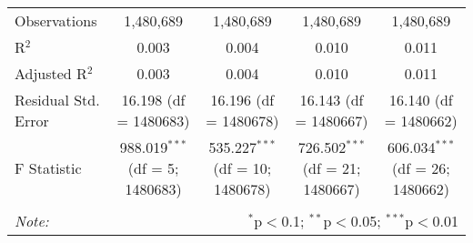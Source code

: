 \documentclass[
]{article}
\begin{document}
\begin{table}[!htbp]
{\begin{tabular}{@{\extracolsep{5pt}}lcccc}
Observations & 1,480,689 & 1,480,689 & 1,480,689 & 1,480,689 \\ 
R$^{2}$ & 0.003 & 0.004 & 0.010 & 0.011 \\ 
Adjusted R$^{2}$ & 0.003 & 0.004 & 0.010 & 0.011 \\ 
Residual Std. Error & 16.198 (df = 1480683) & 16.196 (df = 1480678) & 16.143 (df = 1480667) & 16.140 (df = 1480662) \\ 
F Statistic & 988.019$^{***}$ (df = 5; 1480683) & 535.227$^{***}$ (df = 10; 1480678) & 726.502$^{***}$ (df = 21; 1480667) & 606.034$^{***}$ (df = 26; 1480662) \\ 
\hline 
\hline \\[-1.8ex] 
\textit{Note:}  & \multicolumn{4}{r}{$^{*}$p$<$0.1; $^{**}$p$<$0.05; $^{***}$p$<$0.01} \\ 
\end{tabular}
} 
\end{table} 
\newpage
\end{document}
